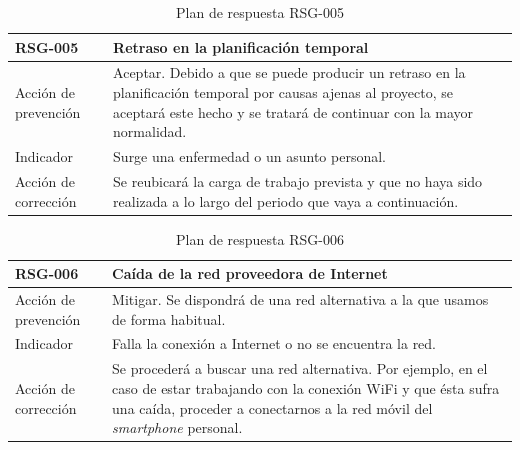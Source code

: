 \begin{table}[htpb]
\centering
\begin{tabularx}{\textwidth}{|l|X|}
\hline
RSG-005              & Retraso en la planificación temporal                                                                                                                                                     \\ \hline
Acción de prevención & Aceptar. Debido a que se puede producir un retraso en la planificación temporal por causas ajenas al proyecto, se aceptará este hecho y se tratará de continuar con la mayor normalidad. \\ \hline
Indicador            & Surge una enfermedad o un asunto personal.                                                                                                                                               \\ \hline
Acción de corrección & Se reubicará la carga de trabajo prevista y que no haya sido realizada a lo largo del periodo que vaya a continuación.                                                                   \\ \hline
\end{tabularx}
\caption{Plan de respuesta RSG-005}
\end{table}


\begin{table}[htpb]
\centering
\begin{tabularx}{\textwidth}{|l|X|}
\hline
RSG-006              & Caída de la red proveedora de Internet                                                                                                                                                                 \\ \hline
Acción de prevención & Mitigar. Se dispondrá de una red alternativa a la que usamos de forma habitual.                                                                                                                        \\ \hline
Indicador            & Falla la conexión a Internet o no se encuentra la red.                                                                                                                                                 \\ \hline
Acción de corrección & Se procederá a buscar una red alternativa. Por ejemplo, en el caso de estar trabajando con la conexión WiFi y que ésta sufra una caída, proceder a conectarnos a la red móvil del \textit{smartphone} personal. \\ \hline
\end{tabularx}
\caption{Plan de respuesta RSG-006}
\end{table}


